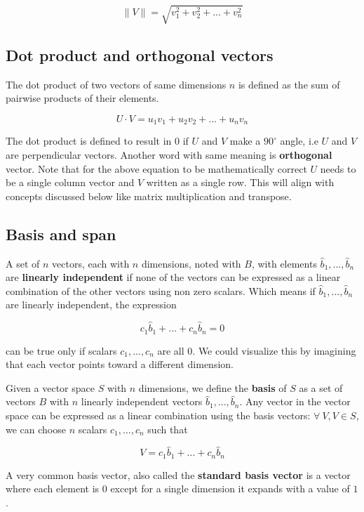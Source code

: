 \[\|V\| = \sqrt {v_1^2 + v_2^2 + ... + v_n^2}\]

\subsection{Dot product and orthogonal vectors}

The dot product of two vectors of same dimensions \(n\) is defined as the sum of pairwise products of their elements.

\[U \cdot V = u_1 v_1 + u_2 v_2 + ... + u_n v_n\]

The dot product is defined to result in \(0\) if \(U\) and \(V\) make a \(90 ^{\circ}\) angle, i.e \(U\) and \(V\) are perpendicular vectors. Another word with same meaning is \textbf{orthogonal} vector. Note that for the above equation to be mathematically correct \(U\) needs to be a single column vector and \(V\) written as a single row. This will align with concepts discussed below like matrix multiplication and transpose.

\subsection{Basis and span}

A set of \(n\) vectors, each with \(n\) dimensions, noted with \(B\), with elements \(\hat{b}_1, ..., \hat{b}_n\) are \textbf{linearly independent} if none of the vectors can be expressed as a linear combination of the other vectors using non zero scalars. Which means if \(\hat{b}_1, ..., \hat{b}_n\) are linearly independent, the expression

\[c_1\hat{b}_1 + ... + c_n \hat{b}_n = 0\]

can be true only if scalars \(c_1, ..., c_n\) are all \(0\). We could visualize this by imagining that each vector points toward a different dimension.

Given a vector space \(S\) with \(n\) dimensions, we define the \textbf{basis} of \(S\) as a set of vectors \(B\) with \(n\) linearly independent vectors \(\hat{b}_1, ..., \hat{b}_n\). Any vector in the vector space can be expressed as a linear combination using the basis vectors: \(\forall\ V, V \in S\), we can choose \(n\) scalars \(c_1, ..., c_n\) such that

\[V = c_1\hat{b}_1 + ... + c_n\hat{b}_n\]

A very common basis vector, also called the \textbf{standard basis vector} is a vector where each element is \(0\) except for a single dimension it expands with a value of \(1\).

